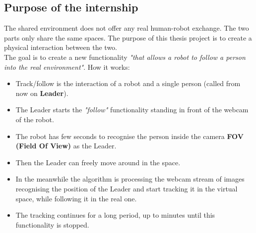 \subsection{Purpose of the internship}
The shared environment does not offer any real human-robot exchange. The two parts only share the same spaces. The purpose of this thesis project is to create a physical interaction between the two.\\
The goal is to create a new functionality \textit{"that allows a robot to follow a person into the real environment"}. How it works:
\begin{itemize}
	\item Track/follow is the interaction of a robot and a single person (called from now on \textbf{Leader}).
	\item The Leader starts the \textit{"follow"} functionality standing in front of the webcam of the robot.
	\item The robot has few seconds to recognise the person inside the camera \textbf{FOV (Field Of View)} as the Leader.
	\item Then the Leader can freely move around in the space. 
	\item In the meanwhile the algorithm is processing the webcam stream of images recognising the position of the Leader and start tracking it in the virtual space, while following it in the real one.
	\item The tracking continues for a long period, up to minutes until this functionality is stopped.
\end{itemize}

